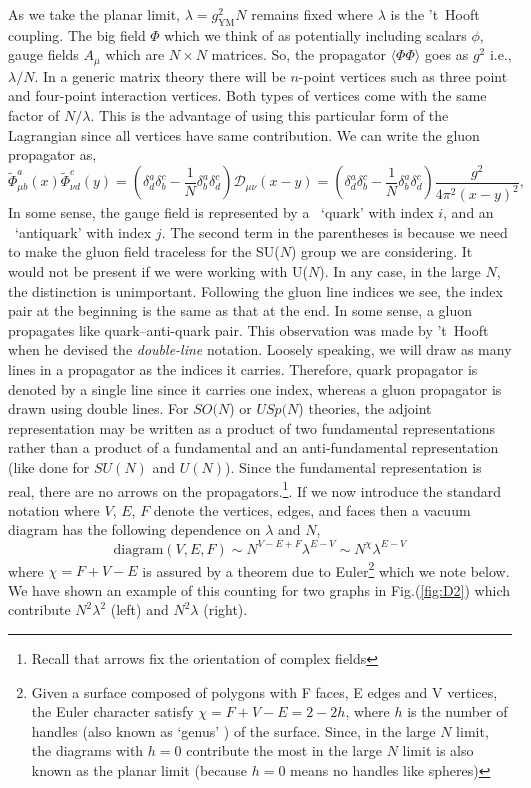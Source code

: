 \documentclass[11pt]{article}
\begin{document}
As we take the planar limit, $\lambda = g_{\text{YM}}^{2} N $ remains fixed where $\lambda$ is the 't~Hooft coupling. The big field $\Phi$ which we think of as potentially including scalars $\phi$, gauge fields $A_{\mu}$ which are $N \times N$ matrices. So, the propagator $\langle \Phi \Phi \rangle$ goes as $g^2$ i.e., $\lambda/N$. In a generic matrix theory there will be $n$-point vertices such as three point and four-point interaction vertices. Both types of vertices come with the same factor of $N/\lambda$. This is the advantage of using this particular form of the Lagrangian since all vertices have same contribution. We can write the gluon propagator as,  %
\begin{equation}
\label{eq:gluon}
\tilde{\Phi}^{a}_{\mu b}(x) \tilde{\Phi}^{c}_{\nu d}(y) = \left ( \delta^{a}_{d}\delta^{c}_{b} - \frac{1}{N} \delta^{a}_{b}\delta^{c}_{d}\right)
\mathscr{D}_{\mu\nu}(x-y) =  \left ( \delta^{a}_{d}\delta^{c}_{b} - \frac{1}{N} \delta^{a}_{b}\delta^{c}_{d}\right)
\frac{g^2}{4\pi^2(x-y)^2}, 
\end{equation}
In some sense, the gauge field is represented by a ~`quark' with index $i$, and an ~`antiquark' with index $j$. 
The second term in the parentheses is because we need to make the gluon field traceless for the SU($N$) group we are
considering. It would not be present if we were working with U($N$). In any case, in the large $N$, 
the distinction is unimportant. Following the gluon line indices we see, the index pair at the beginning is 
the same as that at the end. In some sense, 
a gluon propagates like quark--anti-quark pair. This observation was made by 't~Hooft when he devised the \emph{double-line}  
notation. Loosely speaking, we will draw as many lines in a propagator as the indices it carries. Therefore, quark propagator 
is denoted by a single line since it carries one index, whereas a gluon propagator is drawn using double lines. 
For $SO(N$) or $USp(N$) theories, the adjoint representation may be written as a product of two fundamental representations 
rather than a product of a fundamental and an anti-fundamental representation (like done for $SU(N)$ and $U(N)$). Since the
fundamental representation is real, there are no arrows on the propagators.\footnote{Recall that arrows fix the orientation of complex fields}. If we now introduce the standard notation where $V$, $E$, $F$ denote the vertices, edges, and faces then a vacuum diagram 
has the following dependence on $\lambda$ and $N$, 
\[ \text{diagram}(V,E,F) \sim N^{V-E+F} \lambda^{E-V}  \sim N^{\chi} \lambda^{E-V} \] 
where $\chi = F + V - E$ is assured by a theorem due to Euler\footnote{Given a surface composed of polygons with F faces, E edges and V vertices, the Euler character satisfy
	$\chi = F + V - E = 2 - 2h$, where $h$ is the number of handles (also known as `genus' ) of the surface. Since, in the large $N$ limit, the diagrams with $h = 0$ contribute the most in the large $N$ limit is also known as the planar limit (because $h=0$ means no handles like spheres)} which we note below. 
We have shown an example of this counting for two graphs in Fig.(\ref{fig:D2}) which contribute $N^2\lambda^2$ (left) and
$N^2\lambda$ (right). 
\end{document}
